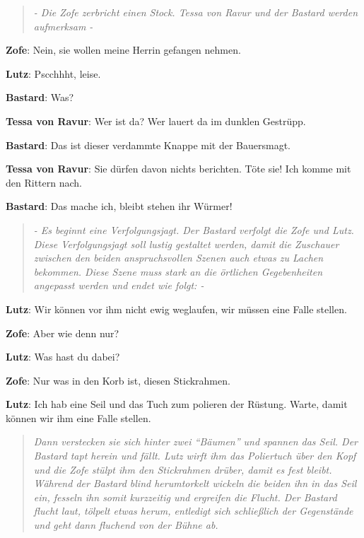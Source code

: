 \documentclass[a5paper,6pt]{book}
\begin{document}
\begin{quote}
  \textit{- Die Zofe zerbricht einen Stock. Tessa von Ravur und der Bastard werden aufmerksam -}
 \end{quote}


\textbf{Zofe}: Nein, sie wollen meine Herrin gefangen nehmen.

\textbf{Lutz}: Pscchhht, leise.

\textbf{Bastard}: Was?

\textbf{Tessa von Ravur}: Wer ist da? Wer lauert da im dunklen Gestrüpp.

\textbf{Bastard}: Das ist dieser verdammte Knappe mit der Bauersmagt.

\textbf{Tessa von Ravur}: Sie dürfen davon nichts berichten. Töte sie! Ich komme mit den Rittern nach.

\textbf{Bastard}: Das mache ich, bleibt stehen ihr Würmer!

\begin{quote}
  \textit{- Es beginnt eine Verfolgungsjagt. Der Bastard verfolgt die Zofe und Lutz. Diese Verfolgungsjagt soll lustig gestaltet werden, damit die Zuschauer zwischen den beiden anspruchsvollen Szenen auch etwas zu Lachen bekommen.
Diese Szene muss stark an die örtlichen Gegebenheiten angepasst werden und endet wie folgt: -}
 \end{quote}


\textbf{Lutz}: Wir können vor ihm nicht ewig weglaufen, wir müssen eine Falle stellen.

\textbf{Zofe}: Aber wie denn nur?

\textbf{Lutz}: Was hast du dabei?

\textbf{Zofe}: Nur was in den Korb ist, diesen Stickrahmen.

\textbf{Lutz}: Ich hab eine Seil und das Tuch zum polieren der Rüstung. Warte, damit können wir ihm eine Falle stellen.

\begin{quote}
  \textit{Dann verstecken sie sich hinter zwei “Bäumen” und spannen das Seil. Der Bastard tapt herein und fällt. Lutz wirft ihm das Poliertuch über den Kopf und die Zofe stülpt ihm den Stickrahmen drüber, damit es fest bleibt. Während der Bastard blind herumtorkelt wickeln die beiden ihn in das Seil ein, fesseln ihn somit kurzzeitig und ergreifen die Flucht.
Der Bastard flucht laut, tölpelt etwas herum, entledigt sich schließlich der Gegenstände und geht dann fluchend von der Bühne ab.
}
 \end{quote}
\end{document}
